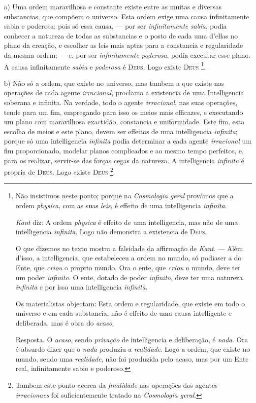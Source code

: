 a) Uma ordem maravilhosa e constante existe entre as muitas e diversas substancias, que compõem o universo. Esta ordem exige uma causa infinitamente sabia e poderosa; pois só essa causa, --- por ser \emph{infinitamente sabia}, podia conhecer a natureza de todas as substancias e o posto de cada uma d'ellas no plano da creação, e escolher as leis mais aptas para a constancia e regularidade da mesma ordem; --- e, por ser \emph{infinitamente poderosa}, podia executar esse plano. A causa infinitamente \emph{sabia} e \emph{poderosa} é \textsc{Deus}. Logo existe \textsc{Deus} \footnote{Não insistimos neste ponto; porque na \emph{Cosmologia geral} provámos que a ordem \emph{physica}, com as suas \emph{leis}, é effeito de uma intelligencia \emph{infinita}.\par \emph{Kant} diz: A ordem \emph{physica} é effeito de uma intelligencia, mas não de uma intelligencia \emph{infinita}. Logo não demonstra a existencia de \textsc{Deus}.\par O que dizemos no texto mostra a falsidade da affirmação de \emph{Kant}. --- Além d'isso, a intelligencia, que estabeleceu a ordem no mundo, só podiaser a do Ente, que \emph{criou} o proprio mundo. Ora o ente, que \emph{criou} o mundo, deve ter um poder \emph{infinito}. O ente, dotado de poder \emph{infinito}, deve ter uma natureza \emph{infinita} e por isso uma intelligencia \emph{infinita}.\par Os materialistas objectam: Esta ordem e regularidade, que existe em todo o universo e em cada substancia, não é effeito de uma causa intelligente e deliberada, mas é obra do \emph{acaso}.\par Resposta. O \emph{acaso}, sendo \emph{privação} de intelligencia e deliberação, é \emph{nada}. Ora é absurdo dizer que o \emph{nada} produziu a \emph{realidade}. Logo a ordem, que existe no mundo, sendo uma \emph{realidade}, não foi produzida pelo acaso, mas por um Ente real, infinitamente sabio e poderoso.}.

b) Não só a ordem, que existe no universo, mas tambem a que existe nas operações de cada agente \emph{irracional}, proclama a existencia de uma Intelligencia soberana e infinita. Na verdade, todo o agente \emph{irracional}, nas suas operações, tende para um fim, empregando para isso os meios mais efficazes, e executando um plano com maravilhosa exactidão, constancia e uniformidade. Este fim, esta escolha de meios e este plano, devem ser effeitos de uma intelligencia \emph{infinita}; porque só uma intelligencia \emph{infinita} podia determinar a cada agente \emph{irracional} um fim proporcionado, modelar planos complicados e ao mesmo tempo perfeitos, e, para os realizar, servir-se das forças cegas da natureza. A intelligencia \emph{infinita} é propria de \textsc{Deus}. Logo existe \textsc{Deus} \footnote{Tambem este ponto acerca da \emph{finalidade} nas operações dos agentes \emph{irracionaes} foi suficientemente tratado na \emph{Cosmologia geral}.}.

